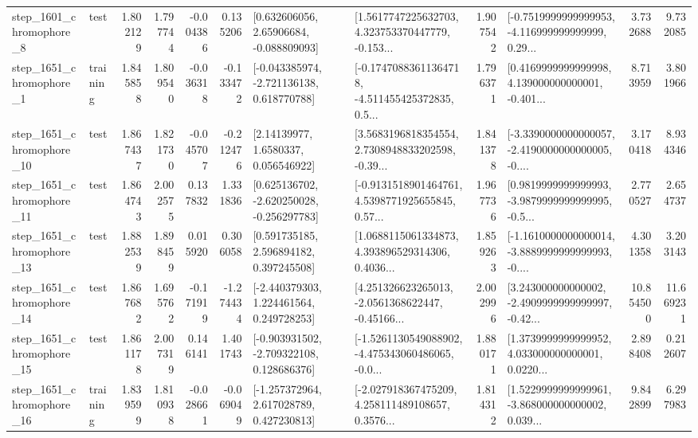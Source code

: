 \begin{tabular}{llrrrrllrlrr}
  step\_1601\_chromophore\_8 &      test &      1.802129 &    1.797744 &     -0.004386 &  0.135206 &     [0.632606056, 2.65906684, -0.088809093] &  [1.5617747225632703, 4.323753370447779, -0.153... &       1.907542 &  [-0.7519999999999953, -4.116999999999999, 0.29... &            3.732688 &          9.732085 \\
  step\_1651\_chromophore\_1 &  training &      1.845858 &    1.809540 &     -0.036318 & -0.133472 &   [-0.043385974, -2.721136138, 0.618770788] &  [-0.17470883611364718, -4.511455425372835, 0.5... &       1.796371 &  [0.4169999999999998, 4.139000000000001, -0.401... &            8.713959 &          3.801966 \\
 step\_1651\_chromophore\_10 &      test &      1.867437 &    1.821730 &     -0.045707 & -0.212476 &        [2.14139977, 1.6580337, 0.056546922] &  [3.5683196818354554, 2.7308948833202598, -0.39... &       1.841378 &  [-3.3390000000000057, -2.4190000000000005, -0.... &            3.170418 &          8.934346 \\
 step\_1651\_chromophore\_11 &      test &      1.864743 &    2.002575 &      0.137832 &  1.331836 &   [0.625136702, -2.620250028, -0.256297783] &  [-0.9131518901464761, 4.5398771925655845, 0.57... &       1.967736 &  [0.9819999999999993, -3.9879999999999995, -0.5... &            2.770527 &          2.654737 \\
 step\_1651\_chromophore\_13 &      test &      1.882539 &    1.898459 &      0.015920 &  0.306058 &     [0.591735185, 2.596894182, 0.397245508] &  [1.0688115061334873, 4.393896529314306, 0.4036... &       1.859263 &  [-1.1610000000000014, -3.8889999999999993, -0.... &            4.301358 &          3.203143 \\
 step\_1651\_chromophore\_14 &      test &      1.867682 &    1.695762 &     -0.171919 & -1.274434 &    [-2.440379303, 1.224461564, 0.249728253] &  [4.251326623265013, -2.0561368622447, -0.45166... &       2.002996 &  [3.243000000000002, -2.4909999999999997, -0.42... &           10.854500 &         11.669231 \\
 step\_1651\_chromophore\_15 &      test &      1.861178 &    2.007319 &      0.146141 &  1.401743 &   [-0.903931502, -2.709322108, 0.128686376] &  [-1.5261130549088902, -4.475343060486065, -0.0... &       1.880171 &  [1.3739999999999952, 4.033000000000001, 0.0220... &            2.898408 &          0.212607 \\
 step\_1651\_chromophore\_16 &  training &      1.839599 &    1.810938 &     -0.028661 & -0.069049 &    [-1.257372964, 2.617028789, 0.427230813] &  [-2.027918367475209, 4.258111489108657, 0.3576... &       1.814312 &  [1.5229999999999961, -3.868000000000002, 0.039... &            9.842899 &          6.297983 \\

\end{tabular}
